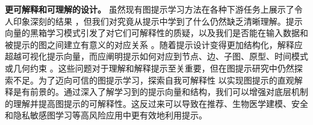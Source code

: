 \textbf{更可解释和可理解的设计。} 虽然现有图提示学习方法在各种下游任务上展示了令人印象深刻的结果 \cite{guo2023datacentric, wen2023voucher, yang2023empirical}，但我们对究竟从提示中学到了什么仍然缺乏清晰理解。提示向量的黑箱学习模式引发了对它们可解释性的质疑，以及我们是否能在输入数据和被提示的图之间建立有意义的对应关系 \cite{sun2023all}。随着提示设计变得更加结构化，解释应超越可视化提示向量，而应阐明提示如何对应到节点、边、子图、原型、时间模式或几何约束 \cite{gong2024selfpro, ge2024psp, fu2025edge, yan2024igap}。这些问题对于理解和解释提示至关重要，但在图提示研究中仍然探索不足。为了迈向可信的图提示学习，探索自我可解释性 \cite{dai2021selfexplainable}
以实现图提示的直观解释是有前景的。通过深入了解学习到的提示向量和结构，我们可以增强对底层机制的理解并提高图提示的可解释性。这反过来可以导致在推荐、生物医学建模、安全和隐私敏感图学习等高风险应用中更有效地利用提示。
